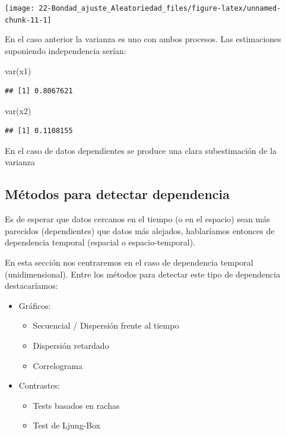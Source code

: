 \documentclass[
]{book}
\newenvironment{Shaded}{\begin{snugshade}}{\end{snugshade}}
\newcommand{\FunctionTok}[1]{\textcolor[rgb]{0.00,0.00,0.00}{#1}}
\newcommand{\NormalTok}[1]{#1}
\theoremstyle{break}
\theoremstyle{nonumberplain}
\begin{document}
\begin{center}\texttt{[image: 22-Bondad\_ajuste\_Aleatoriedad\_files/figure-latex/unnamed-chunk-11-1]} \end{center}

En el caso anterior la varianza es uno con ambos procesos.
Las estimaciones suponiendo independencia serían:

\begin{Shaded}
\begin{Highlighting}[]
\FunctionTok{var}\NormalTok{(x1)}
\end{Highlighting}
\end{Shaded}

\begin{verbatim}
## [1] 0.8067621
\end{verbatim}

\begin{Shaded}
\begin{Highlighting}[]
\FunctionTok{var}\NormalTok{(x2)}
\end{Highlighting}
\end{Shaded}

\begin{verbatim}
## [1] 0.1108155
\end{verbatim}

En el caso de datos dependientes se produce una clara subestimación de la varianza

\hypertarget{muxe9todos-para-detectar-dependencia}{%
\subsection{Métodos para detectar dependencia}\label{muxe9todos-para-detectar-dependencia}}

Es de esperar que datos cercanos en el tiempo (o en el espacio)
sean más parecidos (dependientes) que datos más alejados, hablaríamos entonces de dependencia temporal (espacial o espacio-temporal).

En esta sección nos centraremos en el caso de dependencia temporal (unidimensional).
Entre los métodos para detectar este tipo de dependencia destacaríamos:

\begin{itemize}
\item
  Gráficos:

  \begin{itemize}
  \item
    Secuencial / Dispersión frente al tiempo
  \item
    Dispersión retardado
  \item
    Correlograma
  \end{itemize}
\item
  Contrastes:

  \begin{itemize}
  \item
    Tests basados en rachas
  \item
    Test de Ljung-Box
  \end{itemize}
\end{itemize}
\end{document}
